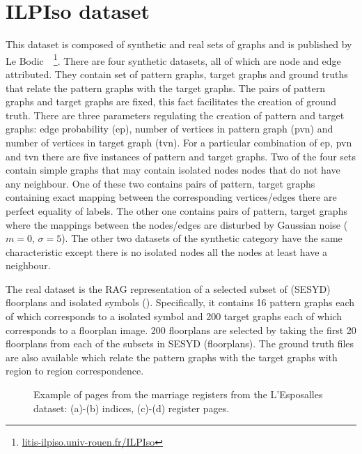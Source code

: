 \section{ILPIso dataset}
\label{sec:datasets:ilpiso}
This dataset is composed of synthetic and real sets of graphs and is published by Le Bodic~\etal~\cite{LeBodic2012}\footnote{\url{litis-ilpiso.univ-rouen.fr/ILPIso}}. There are four synthetic datasets, all of which are node and edge attributed. They contain set of pattern graphs, target graphs and ground truths that relate the pattern graphs with the target graphs. The pairs of pattern graphs and target graphs are fixed, this fact facilitates the creation of ground truth. There are three parameters regulating the creation of pattern and target graphs: edge probability (ep), number of vertices in pattern graph (pvn) and number of vertices in target graph (tvn). For a particular combination of ep, pvn and tvn there are five instances of pattern and target graphs. Two of the four sets contain simple graphs that may contain isolated nodes \ie nodes that do not have any neighbour. One of these two contains pairs of pattern, target graphs containing exact mapping between the corresponding vertices/edges \ie there are perfect equality of labels. The other one contains pairs of pattern, target graphs where the mappings between the nodes/edges are disturbed by Gaussian noise ($m=0$, $\sigma=5$). The other two datasets of the synthetic category have the same characteristic except there is no isolated nodes \ie all the nodes at least have a neighbour.

The real dataset is the RAG representation of a selected subset of (SESYD) floorplans and isolated symbols (). Specifically, it contains 16 pattern graphs each of which corresponds to a isolated symbol and 200 target graphs each of which corresponds to a floorplan image. 200 floorplans are selected by taking the first 20 floorplans from each of the subsets in SESYD (floorplans). The ground truth files are also available which relate the pattern graphs with the target graphs with region to region correspondence.

\begin{figure}[h!]
\begin{center}
\hspace{0.5mm}
\hspace{0.5mm}
\hspace{0.5mm}
\end{center}
\caption{Example of pages from the marriage registers from the L'Esposalles dataset: (a)-(b) indices, (c)-(d) register pages.}
\label{fig:datasets:lesposalles}
\end{figure}

